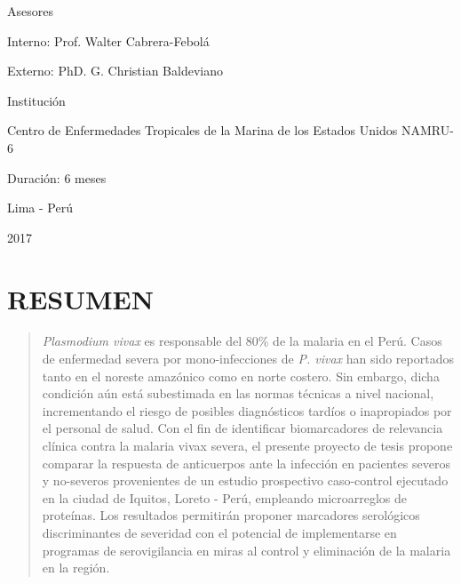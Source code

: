 \documentclass[]{article}
\begin{document}
\begin{centering}
\vspace{.3 cm}

Asesores

Interno: Prof. Walter Cabrera-Febolá

Externo: PhD. G. Christian Baldeviano

\vspace{.3 cm}

Institución

Centro de Enfermedades Tropicales de la Marina de los Estados Unidos 
NAMRU-6

\vspace{.3 cm}

Duración: 6 meses

\vspace{1 cm}

\Large
Lima - Perú


2017

\end{centering}

\vfill
\restoregeometry
\clearpage

\newpage

\tableofcontents

\newpage


\section*{RESUMEN}\label{resumen}

\begin{quote}
\emph{Plasmodium vivax} es responsable del 80\% de la malaria en el
Perú. Casos de enfermedad severa por mono-infecciones de \emph{P. vivax}
han sido reportados tanto en el noreste amazónico como en norte costero.
Sin embargo, dicha condición aún está subestimada en las normas técnicas
a nivel nacional, incrementando el riesgo de posibles diagnósticos
tardíos o inapropiados por el personal de salud. Con el fin de
identificar biomarcadores de relevancia clínica contra la malaria vivax
severa, el presente proyecto de tesis propone comparar la respuesta de
anticuerpos ante la infección en pacientes severos y no-severos
provenientes de un estudio prospectivo caso-control ejecutado en la
ciudad de Iquitos, Loreto - Perú, empleando microarreglos de proteínas.
Los resultados permitirán proponer marcadores serológicos discriminantes
de severidad con el potencial de implementarse en programas de
serovigilancia en miras al control y eliminación de la malaria en la
región.
\end{quote}
\end{document}

